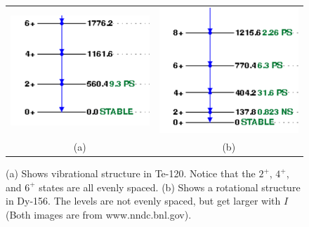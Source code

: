 \documentclass[letter]{article}
\begin{document}
\begin{itemize}
\begin{figure}[hbt]
\begin{tabular}{cc}
    \includegraphics{images/te_120_rot} &
    \includegraphics{images/dy_156_vib} \\
      \small{(a)} & \small{(b)}
    \end{tabular}
    \caption{(a) Shows vibrational structure in Te-120. Notice that the $2^+$,
      $4^+$, and $6^+$ states are all evenly spaced. (b) Shows a
      rotational structure in Dy-156. The levels are not evenly
      spaced, but get larger with $I$ (Both images are from www.nndc.bnl.gov).}
    \label{fig:te120}
  \end{figure}

\end{itemize}
\end{document}
